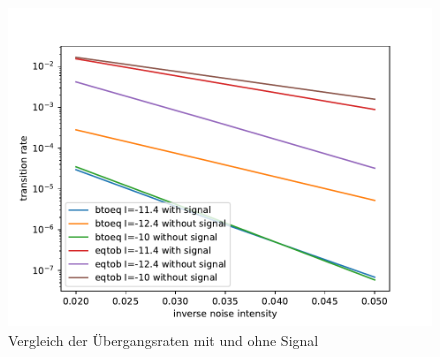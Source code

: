 \documentclass[12pt,a4paper]{article}
\begin{document}
\begin{figure}[H]
	\centering
	\includegraphics[scale=1]{arrhcomp.pdf}\caption{Vergleich der Übergangsraten mit und ohne Signal}
	\label{arrhratecomp}
\end{figure}
\newpage
\end{document}
